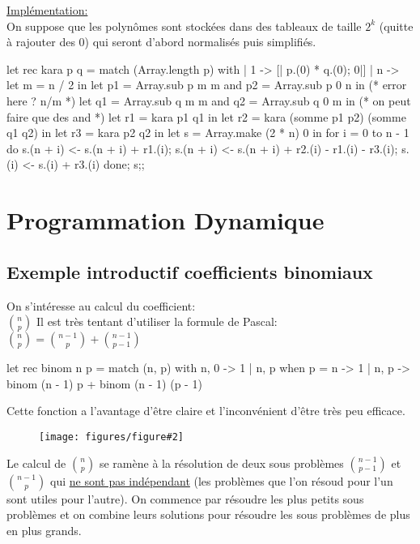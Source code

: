 \documentclass{article}
\newcommand{\schem}[3]
{
	\begin{figure}[ht]
		\centering
		\textbf{#1}\par\medskip
		\texttt{[image: figures/figure\#2]}
		\caption{}
	\end{figure}
}
\begin{document}
			\underline{Implémentation:}\\
			On suppose que les polynômes sont stockées dans des tableaux de taille $2^k$ (quitte à rajouter des 0) qui seront d'abord normalisés puis simplifiés.\\
			
				\begin{case}
let rec kara p q = match (Array.length p) with
| 1 -> [| p.(0) * q.(0); 0|]
| n -> let m = n / 2 in
	let p1 = Array.sub p m m and p2 = Array.sub p 0 n in (* error here ? n/m *)
	let q1 = Array.sub q m m and q2 = Array.sub q 0 m in (* on peut faire que des and *)
	let r1 = kara p1 q1 in
	let r2 = kara (somme p1 p2) (somme q1 q2) in
	let r3 = kara p2 q2 in
	let s = Array.make (2 * n) 0 in
		for i = 0 to n - 1 do
			s.(n + i) <- s.(n + i) + r1.(i);
			s.(n + i) <- s.(n + i) + r2.(i) - r1.(i) - r3.(i);
			s.(i) <- s.(i) + r3.(i)
			done; s;;
				\end{case}
				
				\section{Programmation Dynamique}
				
					\subsection{Exemple introductif coefficients binomiaux}
					
						On s'intéresse au calcul du coefficient:\\
						$\binom{n}{p}$ Il est très tentant d'utiliser la formule de Pascal:\\
						$\binom{n}{p} = \binom{n - 1}{p} + \binom{n - 1}{p - 1}$
						
						\begin{case}
let rec binom n p = match (n, p) with
n, 0 -> 1
| n, p when p = n -> 1
| n, p -> binom (n - 1) p + binom (n - 1) (p - 1)
						\end{case}
				
						Cette fonction a l'avantage d'être claire et l'inconvénient d'être très peu efficace.
						
						\newpage
						\schem{}{8}{0.5}
						
						Le calcul de $\binom{n}{p}$ se ramène à la résolution de deux sous problèmes $\binom{n - 1}{p - 1}$ et $\binom{n - 1}{p}$ qui \underline{ne sont pas indépendant} (les problèmes que l'on résoud pour l'un sont utiles pour l'autre).
						On commence par résoudre les plus petits sous problèmes et on combine leurs solutions pour résoudre les sous problèmes de plus en plus grands.\\
						
\end{document}
